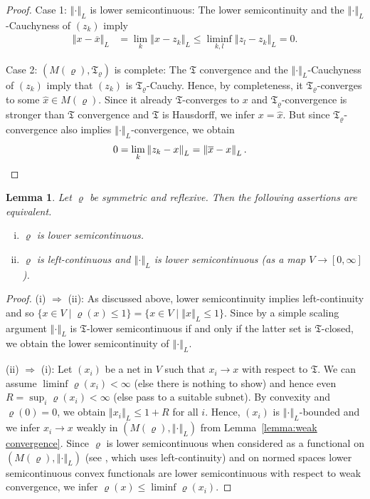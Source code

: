 \documentclass[a4paper,11pt,reqno]{amsart}
\newtheorem{lemma}{Lemma}[section]
\theoremstyle{definition}
\numberwithin{equation}{section}
\newcommand{\vr}{{\varrho}}
\newcommand{\av}[1]{\left\Vert #1\right\Vert}
\newcommand{\1}{\mathds{1}}
\begin{document}
\begin{proof}
  Case 1: $\av{\cdot}_L$ is lower semicontinuous: The lower semicontinuity and the $\av{\cdot}_L$-Cauchyness of $(z_k)$ imply 
%
\begin{align*}
\av{x - \overline{x}}_L &= \lim_{k} \av{x - z_k}_L \leq \liminf_{k,l} \av{z_l  - z_k}_L = 0.  
\end{align*}
%

Case 2:  $(M(\vr),\mathfrak{T}_\vr)$ is complete: The $\mathfrak{T}$ convergence and the $\av{\cdot}_L$-Cauchyness of $(z_k)$ imply that $(z_k)$ is $\mathfrak{T}_\vr$-Cauchy. Hence, by completeness, it $\mathfrak{T}_\vr$-converges to some $\hat x \in M(\vr)$. Since it already $\mathfrak{T}$-converges to $x$ and $\mathfrak{T}_\vr$-convergence is stronger than $\mathfrak{T}$ convergence and $\mathfrak{T}$ is Hausdorff, we infer $x =  \hat x$. But since $\mathfrak{T}_\vr$-convergence also implies $\av{\cdot}_L$-convergence, we obtain 
%
\begin{align*}
 0 &= \lim_k \av{z_k - x}_L = \av{\overline x - x}_L. \hfill \qedhere 
\end{align*}
\end{proof}
%



\begin{lemma}\label{lemma:equivalence of lower semicontinuity}
 Let $\vr$ be symmetric and reflexive. Then the following assertions are equivalent. 
 \begin{enumerate}[(i)]
  \item $\vr$ is lower semicontinuous. 
  \item $\vr$ is left-continuous and $\av{\cdot}_L$ is lower semicontinuous (as a map $V \to [0,\infty]$). 
 \end{enumerate}
\end{lemma}
\begin{proof}
(i) $\Rightarrow$ (ii): As discussed above, lower semicontinuity implies left-continuity and so $\{x \in V \mid \vr(x) \leq 1\} = \{x \in V \mid \av{x}_L \leq 1\}$. Since by a simple scaling argument $\av{\cdot}_L$ is $\mathfrak{T}$-lower semicontinuous if and only if the latter set is $\mathfrak{T}$-closed, we obtain the lower semicontinuity of $\av{\cdot}_L$.  


(ii) $\Rightarrow$ (i):  Let $(x_i)$ be a net in $V$ such that $x_i \to x$ with respect to $\mathfrak{T}$. We can assume $\liminf \vr(x_i)  < \infty$ (else there is nothing to show)  and hence even $R = \sup_i \vr(x_i) < \infty$ (else pass to a suitable subnet). By convexity and $\vr(0) = 0$, we obtain $\av{x_i}_L \leq 1 + R $ for all $i$. Hence, $(x_i)$ is $\av{\cdot}_L$-bounded and we infer $x_i \to x$ weakly in $(M(\vr),\av{\cdot}_L)$ from Lemma~\ref{lemma:weak convergence}. Since $\vr$ is lower semicontinuous when considered as a functional on  $(M(\vr),\av{\cdot}_L)$ (see \cite[Corollary A.4]{SZ25}, which uses left-continuity) and on normed spaces  lower semicontinuous convex functionals are  lower semicontinuous with respect to weak convergence, we infer $\vr(x) \leq \liminf \vr(x_i).$
\end{proof}
\end{document}
